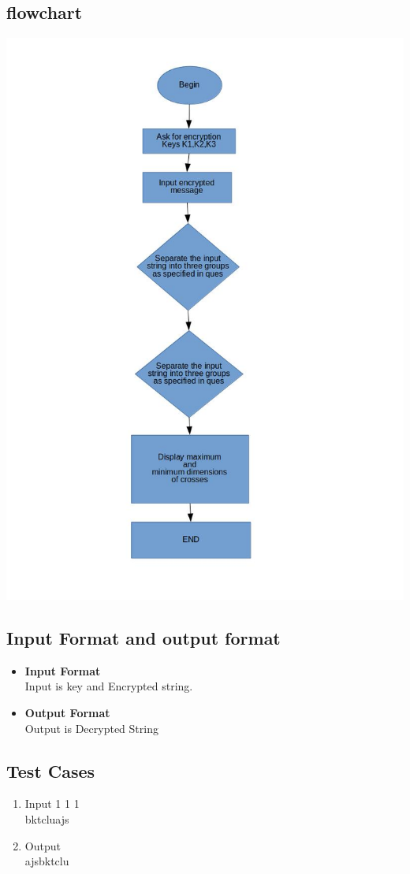 \documentclass[a4paper,12pt]{article}
\begin{document}
\subsection{flowchart}
\includegraphics[scale=.5]{ps2flow.jpg}

\subsection{Input Format and output format}
\begin{itemize}
	\item \textbf{Input Format}\\
	Input is key and Encrypted string.
	\item \textbf{Output Format}\\
	Output is Decrypted String
\end{itemize}
	\subsection{Test Cases}
\begin{enumerate}
	\item Input
	1 1 1\\
	bktcluajs\\
	\item Output \\
	ajsbktclu
	
\end{enumerate}
\end{document}
